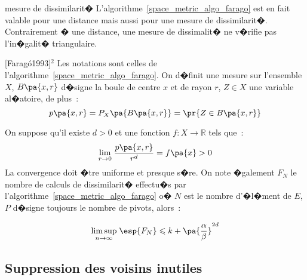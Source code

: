 \begin{xremark}{mesure de dissimilarit�}
L'algorithme~\ref{space_metric_algo_farago} est en fait valable pour une distance mais aussi pour une mesure de dissimilarit�. Contrairement � une distance, une mesure de dissimalit� ne v�rifie pas l'in�galit� triangulaire.
\end{xremark}


            \begin{xtheorem}{[Farag\'o1993]$^2$}
                                                                \label{space_metric_farago_2}
            Les notations sont celles de l'algorithme~\ref{space_metric_algo_farago}. On d�finit une mesure 
            sur l'ensemble $X$, $B\pa{x,r}$ d�signe la boule de centre $x$ et de rayon $r$, $Z \in X$ une variable 
            al�atoire, de plus~:
                        $$
                        p\pa{x,r} = P_X \pa{B\pa{x,r}} = \pr{  Z \in B\pa{x,r}}
                        $$
                        
            On suppose qu'il existe $d > 0$ et une fonction $f : X \longrightarrow \mathbb{R}$ tels que~:
                        $$
                        \underset { r \rightarrow 0 } { \lim } \; \frac{ p\pa{x,r} } { r^d } = f\pa{x} > 0
                        $$
          La convergence doit �tre uniforme et presque s�re.
          On note �galement $F_N$ le nombre de calculs de dissimilarit� effectu�s par 
          l'algorithme~\ref{space_metric_algo_farago} o� $N$ est le nombre d'�l�ment de $E$, 
          $P$ d�signe toujours le nombre de pivots, alors~:
          
                      $$
                      \underset{ n \rightarrow \infty } { \lim \sup } \;
                                      \esp{F_N} \leqslant k + \pa{\frac{\alpha}{\beta}}^{2d}
                      $$
                                                                            
            \end{xtheorem}









\subsection{Suppression des voisins inutiles}
\label{space_metric_suppression_voisins_inutile}

